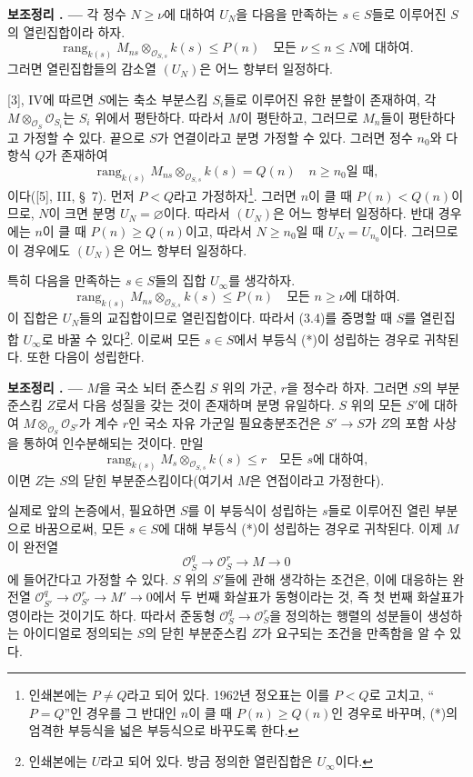 \documentclass[11pt,twoside,openany]{book}
\numberwithin{equation}{section}
\newcommand{\sourceunit}{front}
\newcommand{\src}[1]{%
  \phantomsection\hypertarget{src:\sourceunit:#1}{}%
  \marginpar{\raggedleft\footnotesize\sffamily #1}%
}
\theoremstyle{plain}
\theoremstyle{definition}
\theoremstyle{remark}
\newcommand{\result}[2]{%
  \par\medskip\noindent\textbf{#1%
  \if\relax\detokenize{#2}\relax\else\space#2\fi. ---}\enspace
}
\begin{document}
\result{보조정리}{3.5} 각 정수 $N\geq\nu$에 대하여 $U_N$을 다음을
만족하는 $s\in S$들로 이루어진 $S$의 열린집합이라 하자.
\[
\operatorname{rang}_{k(s)}
M_{ns}\otimes_{\mathcal O_{S,s}}k(s)\leq P(n)
\quad\text{모든 $\nu\leq n\leq N$에 대하여}.
\]
그러면 열린집합들의 감소열 $(U_N)$은 어느 항부터 일정하다.

[3], IV에 따르면 $S$에는 축소 부분스킴 $S_i$들로 이루어진 유한 분할이
존재하여, 각 $M\otimes_{\mathcal O_S}\mathcal O_{S_i}$는 $S_i$ 위에서
평탄하다. 따라서 $M$이 평탄하고, 그러므로 $M_n$들이 평탄하다고 가정할
수 있다. 끝으로 $S$가 연결이라고 분명 가정할 수 있다. 그러면 정수
$n_0$와 다항식 $Q$가 존재하여
\[
\operatorname{rang}_{k(s)}
M_{ns}\otimes_{\mathcal O_{S,s}}k(s)=Q(n)
\quad\text{$n\geq n_0$일 때},
\]
이다([5], III, \S~7). 먼저 $P<Q$라고 가정하자\footnote{인쇄본에는
$P\neq Q$라고 되어 있다. 1962년 정오표는 이를 $P<Q$로 고치고,
``$P=Q$''인 경우를 그 반대인 $n$이 클 때 $P(n)\geq Q(n)$인 경우로
바꾸며, (*)의 엄격한 부등식을 넓은 부등식으로 바꾸도록 한다.}. 그러면
$n$이 클 때 $P(n)<Q(n)$이므로, $N$이 크면 분명
$U_N=\varnothing$이다. 따라서 $(U_N)$은 어느 항부터 일정하다. 반대
경우에는 $n$이 클 때 $P(n)\geq Q(n)$이고, 따라서 $N\geq n_0$일 때
$U_N=U_{n_0}$이다. 그러므로 이 경우에도 $(U_N)$은 어느 항부터 일정하다.

특히 다음을 만족하는 $s\in S$들의 집합 $U_\infty$를 생각하자.
\[
\tag{*}
\operatorname{rang}_{k(s)}
M_{ns}\otimes_{\mathcal O_{S,s}}k(s)\leq P(n)
\quad\text{모든 $n\geq\nu$에 대하여}.
\]
이 집합은 $U_N$들의 교집합이므로 열린집합이다. 따라서 (3.4)를 증명할
때 $S$를 열린집합 $U_\infty$로 바꿀 수 있다\footnote{인쇄본에는 $U$라고 되어 있다. 방금 정의한 열린집합은 $U_\infty$이다.}.
이로써 모든 $s\in S$에서 부등식 (*)이 성립하는 경우로 귀착된다. 또한
다음이 성립한다.

\result{보조정리}{3.6} $M$을 국소 뇌터 준스킴 $S$ 위의 가군, $r$을
정수라 하자. 그러면 $S$의 부분준스킴 $Z$로서 다음 성질을 갖는 것이
존재하며 분명 유일하다. $S$ 위의 모든 $S'$에 대하여
$M\otimes_{\mathcal O_S}\mathcal O_{S'}$가 계수 $r$인 국소 자유 가군일
필요충분조건은 $S'\longrightarrow S$가 $Z$의 포함 사상을 통하여
인수분해되는 것이다. 만일
\[
\operatorname{rang}_{k(s)}
M_s\otimes_{\mathcal O_{S,s}}k(s)\leq r
\quad\text{모든 $s$에 대하여},
\]
이면 $Z$는 $S$의 닫힌 부분준스킴이다(여기서 $M$은 연접이라고
가정한다).
\src{264}
실제로 앞의 논증에서, 필요하면 $S$를 이 부등식이 성립하는 $s$들로
이루어진 열린 부분으로 바꿈으로써, 모든 $s\in S$에 대해 부등식 (*)이
성립하는 경우로 귀착된다. 이제 $M$이 완전열
\[
\mathcal O_S^q\longrightarrow\mathcal O_S^r\longrightarrow M\longrightarrow0
\]
에 들어간다고 가정할 수 있다. $S$ 위의 $S'$들에 관해 생각하는 조건은,
이에 대응하는 완전열
$\mathcal O_{S'}^q\longrightarrow\mathcal O_{S'}^r
\longrightarrow M'\longrightarrow0$에서 두 번째 화살표가 동형이라는 것,
즉 첫 번째 화살표가 영이라는 것이기도 하다. 따라서 준동형
$\mathcal O_S^q\longrightarrow\mathcal O_S^r$을 정의하는 행렬의 성분들이
생성하는 아이디얼로 정의되는 $S$의 닫힌 부분준스킴 $Z$가 요구되는
조건을 만족함을 알 수 있다.
\end{document}
